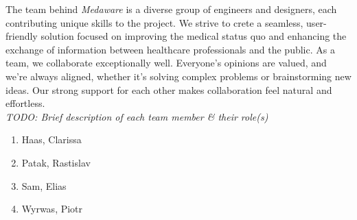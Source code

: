 \vspace*{\fill}
The team behind \textit{Medaware} is a diverse group of engineers and designers, each contributing unique skills to the project.
We strive to crete a seamless, user-friendly solution focused on improving the medical status quo and enhancing the exchange of
information between healthcare professionals and the public. As a team, we collaborate exceptionally well. Everyone's
opinions are valued, and we're always aligned, whether it's solving complex problems or brainstorming new ideas.
Our strong support for each other makes collaboration feel natural and effortless.\\[2\baselineskip]
\textit{TODO: Brief description of each team member \& their role(s)}
\begin{enumerate}
	\item Haas, Clarissa
	\item Patak, Rastislav
	\item Sam, Elias
	\item Wyrwas, Piotr
\end{enumerate}
\vspace*{\fill}
